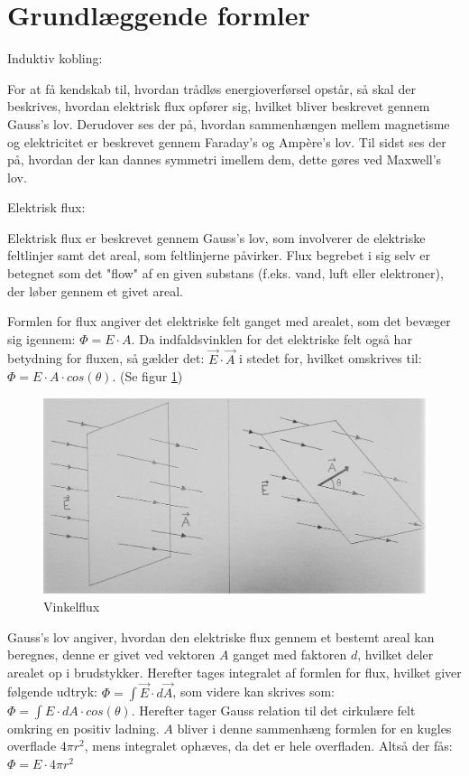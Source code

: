 \section{Grundlæggende formler}

Induktiv kobling:

For at få kendskab til, hvordan trådløs energioverførsel opstår, så skal der beskrives, hvordan elektrisk flux opfører sig, hvilket bliver beskrevet gennem Gauss's lov. Derudover ses der på, hvordan sammenhængen mellem magnetisme og elektricitet er beskrevet gennem Faraday's og Ampère's lov. Til sidst ses der på, hvordan der kan dannes symmetri imellem dem, dette gøres ved Maxwell's lov.

Elektrisk flux:

Elektrisk flux er beskrevet gennem Gauss's lov, som involverer de elektriske feltlinjer samt det areal, som feltlinjerne påvirker. Flux begrebet i sig selv er betegnet som det "flow" af en given substans (f.eks. vand, luft eller elektroner), der løber gennem et givet areal.

Formlen for flux angiver det elektriske felt ganget med arealet, som det bevæger sig igennem: $\Phi = E \cdot A$. Da indfaldsvinklen for det elektriske felt også har betydning for fluxen, så gælder det: $\vec{E} \cdot \vec{A}$ i stedet for, hvilket omskrives til: $\Phi = E \cdot A \cdot cos(\theta)$. (Se figur \ref{vinkelflux})

\begin{figure}[H]
\centering
\includegraphics[scale=0.35]{Vildledning/Schematics/Vinkelflux}
\caption{Vinkelflux}
\label{vinkelflux}
\end{figure}

Gauss's lov angiver, hvordan den elektriske flux gennem et bestemt areal kan beregnes, denne er givet ved vektoren $A$ ganget med faktoren $d$, hvilket deler arealet op i brudstykker. Herefter tages integralet af formlen for flux, hvilket giver følgende udtryk: $\Phi = \int \vec{E} \cdot d \vec{A}$, som videre kan skrives som: $\Phi = \int E \cdot dA \cdot cos(\theta)$. Herefter tager Gauss relation til det cirkulære felt omkring en positiv ladning. $A$ bliver i denne sammenhæng formlen for en kugles overflade $4 \pi r^2$, mens integralet ophæves, da det er hele overfladen. Altså der fås: $\Phi = E \cdot 4 \pi r^2$

